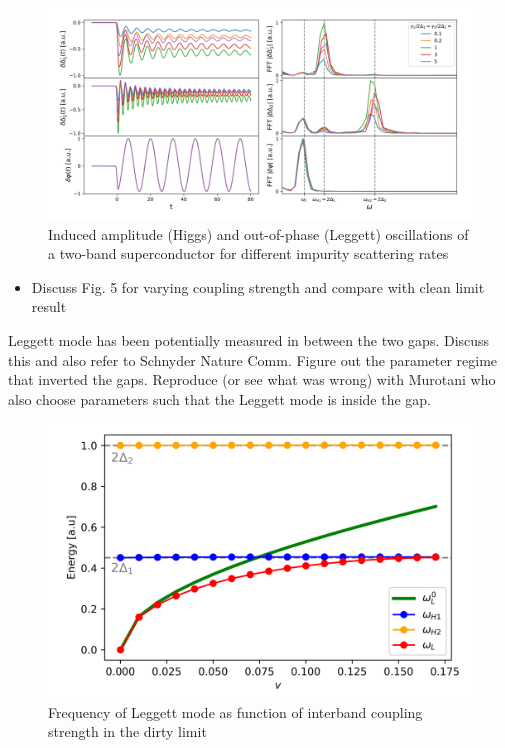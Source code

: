 \documentclass[aps,prb,reprint,noeprint,superscriptaddress]{revtex4-1}
\begin{document}
\begin{figure}[H]
    \centering
    \includegraphics[width=\columnwidth]{figures/leggett_oscillations.png}
    \caption{\label{fig:leggett_oscillations}%
    Induced amplitude (Higgs) and out-of-phase (Leggett) oscillations of a two-band superconductor for different impurity scattering rates}
\end{figure}%

\begin{itemize}
	\item Discuss Fig. 5 for varying coupling strength and compare with clean limit result
\end{itemize}

Leggett mode has been potentially measured in between the two gaps. Discuss this
and also refer to Schnyder Nature Comm. Figure out the parameter regime that
inverted the gaps. Reproduce (or see what was wrong) with Murotani who also
choose parameters such that the Leggett mode is inside the gap.

\begin{figure}[H]
    \centering
    \includegraphics[width=\columnwidth]{figures/leggett_coupling.png}
    \caption{\label{fig:leggett_coupling}%
    Frequency of Leggett mode as function of interband coupling strength in the dirty limit}
\end{figure}%
\end{document}
